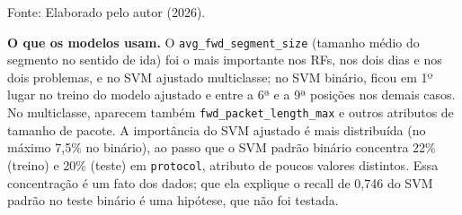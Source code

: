 \documentclass[
    12pt,                %
    openright,           %
    oneside,             %
    a4paper,             %
    english,             %
    brazil               %
]{abntex2}
\begin{document}
\begin{table}
\centering
\caption{Atributo mais importante e participação de \texttt{avg\_fwd\_segment\_size} na importância global (\%)}
\label{tab:shap-principais}
\footnotesize
{}
\par\smallskip
Fonte: Elaborado pelo autor (2026).
\end{table}

\textbf{O que os modelos usam.} O \texttt{avg\_fwd\_segment\_size} (tamanho médio do segmento no sentido de ida) foi o mais importante nos RFs, nos dois dias e nos dois problemas, e no SVM ajustado multiclasse; no SVM binário, ficou em 1º lugar no treino do modelo ajustado e entre a 6ª e a 9ª posições nos demais casos. No multiclasse, aparecem também \texttt{fwd\_packet\_length\_max} e outros atributos de tamanho de pacote. A importância do SVM ajustado é mais distribuída (no máximo 7,5\% no binário), ao passo que o SVM padrão binário concentra 22\% (treino) e 20\% (teste) em \texttt{protocol}, atributo de poucos valores distintos. Essa concentração é um fato dos dados; que ela explique o recall de 0,746 do SVM padrão no teste binário é uma hipótese, que não foi testada.
\end{document}

